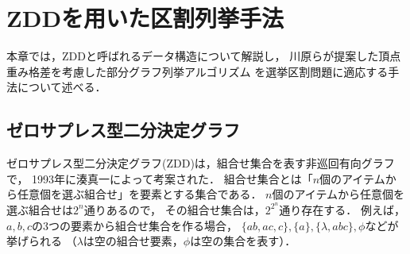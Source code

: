 \chapter{ZDDを用いた区割列挙手法} \label{chapter:3}

本章では，ZDDと呼ばれるデータ構造について解説し，
川原らが提案した頂点重み格差を考慮した部分グラフ列挙アルゴリズム\cite{kawahara}
を選挙区割問題に適応する手法について述べる．

\section{ゼロサプレス型二分決定グラフ}
ゼロサプレス型二分決定グラフ(ZDD)は，組合せ集合を表す非巡回有向グラフで，
1993年に湊真一によって考案された\cite{minato}．
組合せ集合とは「$n$個のアイテムから任意個を選ぶ組合せ」を要素とする集合である．
$n$個のアイテムから任意個を選ぶ組合せは$2^n$通りあるので，
その組合せ集合は，$2^{2^n}$通り存在する．
例えば，$a,b,c$の3つの要素から組合せ集合を作る場合，
$\{ab, ac, c\}, \{a\}, \{\lambda, abc\}, \phi$などが挙げられる
（$\lambda$は空の組合せ要素，$\phi$は空の集合を表す）．

